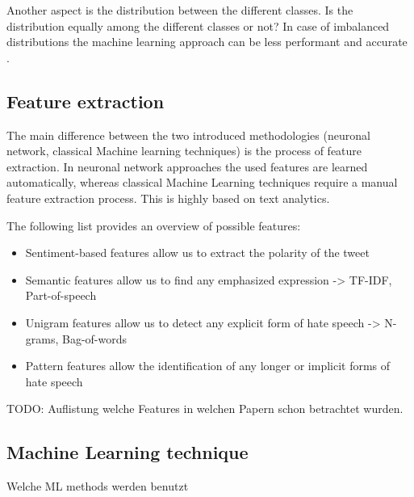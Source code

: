 Another aspect is the distribution between the different classes. Is the distribution equally among the different classes or not? In case of imbalanced distributions the machine learning approach can be less performant and accurate \cite{8963960}.


\subsection{Feature extraction}
The main difference between the two introduced methodologies (neuronal network, classical Machine learning techniques) is the process of feature extraction. In neuronal network approaches the used features are learned automatically, whereas classical Machine Learning techniques require a manual feature extraction process. This is highly based on text analytics.

The following list provides an overview of possible features:
\begin{itemize}
	\item Sentiment-based features
	allow us to extract the polarity of the tweet
	\item Semantic features
	allow us to find any emphasized expression
	-> TF-IDF, Part-of-speech
	\item Unigram features
	allow us to detect any explicit form of hate speech
	-> N-grams, Bag-of-words
	\item Pattern features
	allow the identification of any longer or implicit forms of hate speech
\end{itemize}

TODO: Auflistung welche Features in welchen Papern schon betrachtet wurden.

\subsection{Machine Learning technique}
Welche ML methods werden benutzt
